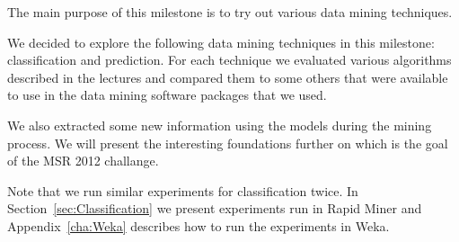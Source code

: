 The main purpose of this milestone is to try out various data mining techniques.

We decided to explore the following data mining techniques in this milestone: classification and prediction. For each technique we evaluated various algorithms described in the lectures and compared them to some others that were available to use in the data mining software packages that we used. 

We also extracted some new information using the models during the mining process. We will present the interesting foundations further on which is the goal of the MSR 2012 challange.

Note that we run similar experiments for classification twice. In Section~\ref{sec:Classification} we present experiments run in Rapid Miner and Appendix~\ref{cha:Weka} describes how to run the experiments in Weka.
